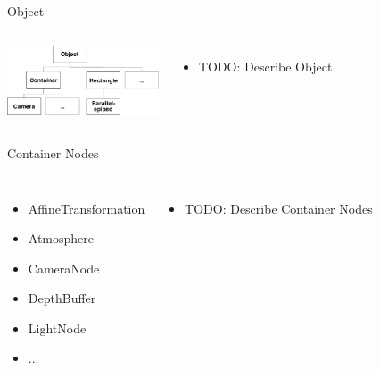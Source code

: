\documentclass[12pt,ucs,hyperref={pdftext}]{beamer}
\newlength{\columnleft}
\newlength{\columnright}
\begin{document}
\begin{frame}{Object}
\begin{columns}

\column{\columnleft}
\includegraphics[width=4.5cm]{media/object.pdf}

\column{\columnright}
\begin{itemize}%
\item TODO: Describe Object
\end{itemize}

\end{columns}
\end{frame}

\begin{frame}{Container Nodes}
\begin{columns}

\column{\columnleft}
\begin{itemize}
\item AffineTransformation
\item Atmosphere
\item CameraNode
\item DepthBuffer
\item LightNode
\item ...
\end{itemize}

\column{\columnright}
\begin{itemize}%
\item TODO: Describe Container Nodes
\end{itemize}

\end{columns}
\end{frame}
\end{document}
